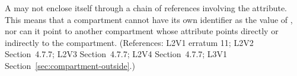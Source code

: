 A \Compartment may not enclose itself through a chain of references
involving the  attribute.  This means that a compartment cannot
have its own identifier as the value of , nor can it point
to another compartment whose  attribute points directly or
indirectly to the compartment.  (References: L2V1 erratum 11; L2V2 Section~4.7.7;
L2V3 Section~4.7.7; L2V4 Section~4.7.7; L3V1 Section~\ref{sec:compartment-outside}.)
